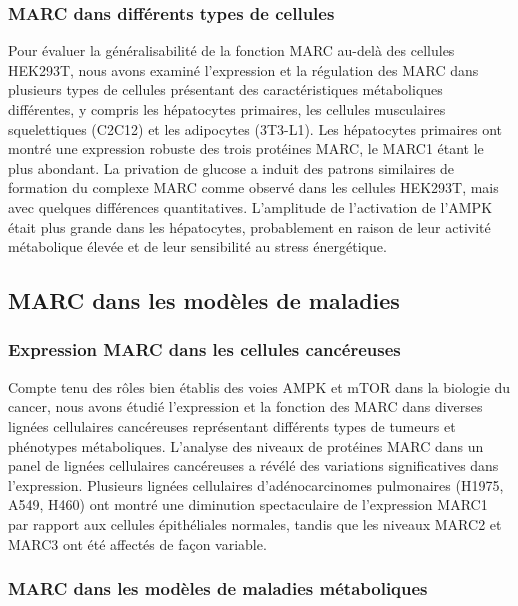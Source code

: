 \documentclass[11pt,a4paper]{article}
\begin{document}
\subsubsection{MARC dans différents types de cellules}

Pour évaluer la généralisabilité de la fonction MARC au-delà des cellules HEK293T, nous avons examiné l'expression et la régulation des MARC dans plusieurs types de cellules présentant des caractéristiques métaboliques différentes, y compris les hépatocytes primaires, les cellules musculaires squelettiques (C2C12) et les adipocytes (3T3-L1). Les hépatocytes primaires ont montré une expression robuste des trois protéines MARC, le MARC1 étant le plus abondant. La privation de glucose a induit des patrons similaires de formation du complexe MARC comme observé dans les cellules HEK293T, mais avec quelques différences quantitatives. L'amplitude de l'activation de l'AMPK était plus grande dans les hépatocytes, probablement en raison de leur activité métabolique élevée et de leur sensibilité au stress énergétique.

\subsection{MARC dans les modèles de maladies}

\subsubsection{Expression MARC dans les cellules cancéreuses}

Compte tenu des rôles bien établis des voies AMPK et mTOR dans la biologie du cancer, nous avons étudié l'expression et la fonction des MARC dans diverses lignées cellulaires cancéreuses représentant différents types de tumeurs et phénotypes métaboliques. L'analyse des niveaux de protéines MARC dans un panel de lignées cellulaires cancéreuses a révélé des variations significatives dans l'expression. Plusieurs lignées cellulaires d'adénocarcinomes pulmonaires (H1975, A549, H460) ont montré une diminution spectaculaire de l'expression MARC1 par rapport aux cellules épithéliales normales, tandis que les niveaux MARC2 et MARC3 ont été affectés de façon variable.

\subsubsection{MARC dans les modèles de maladies métaboliques}
\end{document}
